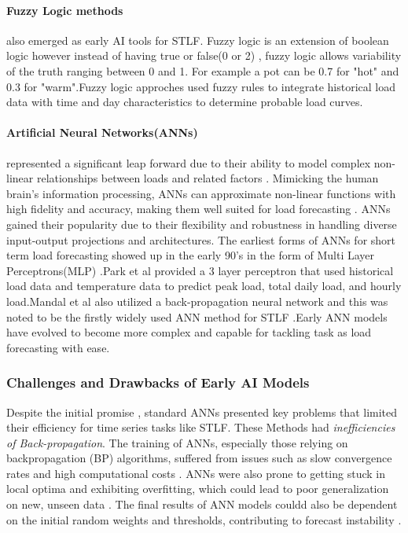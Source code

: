  \paragraph{Fuzzy Logic methods} also emerged as early AI tools for STLF. Fuzzy logic is an extension of boolean logic however instead of having true or false(0 or 2)  , fuzzy logic allows variability of the truth ranging between 0 and 1. For example a pot can be 0.7 for "hot" and 0.3 for "warm".Fuzzy logic approches used fuzzy rules to integrate historical load data with time and day characteristics to determine probable load curves\cite{rafi2021short}.
 
 
 \paragraph{Artificial Neural Networks(ANNs)}represented a significant leap forward due to their ability to model complex non-linear  relationships between loads and related factors \cite{dong2017short}. Mimicking the human brain's information processing, ANNs can approximate non-linear functions with high fidelity and accuracy, making them well suited for  load forecasting \cite{arvanitidis2021enhanced}. ANNs gained their popularity due to their flexibility and robustness in handling diverse input-output projections and architectures. The earliest forms of ANNs for short term load forecasting showed up in the early 90's in the form of Multi Layer Perceptrons(MLP) \cite{arvanitidis2021enhanced}.Park et al \cite{arvanitidis2021enhanced} provided a 3 layer perceptron that used historical load data and temperature data to predict peak load, total daily load, and hourly load.Mandal et al also utilized a back-propagation neural network and this was noted to be the firstly widely used ANN method for STLF \cite{wu2020short}.Early ANN models have evolved to become more complex and capable for tackling task as load forecasting with ease.
 
 
 \subsubsection{Challenges and Drawbacks of Early AI Models}
 Despite the initial promise , standard ANNs presented key problems that limited their efficiency for time series tasks like STLF.
 These Methods had \textit{inefficiencies of Back-propagation}. The training of ANNs, especially those relying on backpropagation (BP) algorithms, suffered from issues such as slow convergence rates and high computational costs \cite{dong2017short}. ANNs were also prone to getting stuck in local optima and exhibiting overfitting, which could lead to poor generalization on new, unseen data \cite{wang2023short}. The final results of ANN models couldd also be dependent on the initial random weights and thresholds, contributing to forecast instability \cite{arvanitidis2021enhanced}.
 

